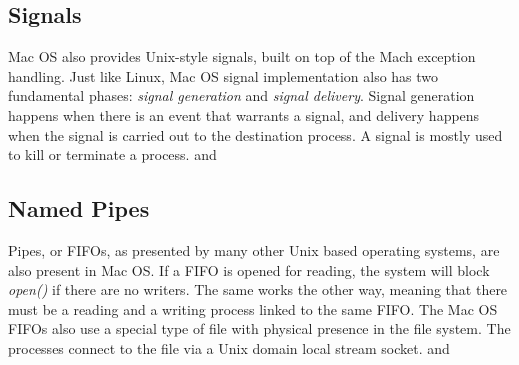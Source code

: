 \documentclass[12pt]{article}
\begin{document}
\subsection{Signals}
	Mac OS also provides Unix-style signals, built on top of the Mach exception handling. Just like Linux, Mac OS signal implementation also has two fundamental phases: \emph{signal generation} and \emph{signal delivery}. Signal generation happens when there is an event that warrants a signal, and delivery happens when the signal is carried out to the destination process. A signal is mostly used to kill or terminate a process. \cite{osxinternals:1} and \cite{osxsystem:1}
	
\subsection{Named Pipes}
	Pipes, or FIFOs, as presented by many other Unix based operating systems, are also present in Mac OS. If a FIFO is opened for reading, the system will block \emph{open()} if there are no writers. The same works the other way, meaning that there must be a reading and a writing process linked to the same FIFO. The Mac OS FIFOs also use a special type of file with physical presence in the file system. The processes connect to the file via a Unix domain local stream socket. \cite{osxinternals:1} and \cite{osxsystem:1}
	
\end{document}
